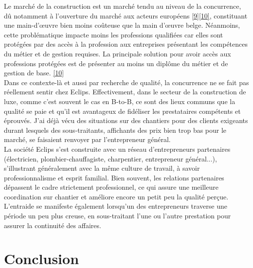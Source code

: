 \documentclass[a4paper, 12pt]{article}
\begin{document}
Le marché de la construction est un marché tendu au niveau de la concurrence, dû notamment à l'ouverture du marché aux acteurs européens \href{https://www.lesoir.be/art/803642/article/economie/immo/une-l-immo/2015-02-24/concurrence-deloyale-mine-secteur-construction}{[9]}\href{https://atradius.fr/publications/market-monitor-construction-belgique-2019.html}{[10]}, constituant une main-d'\oe{}uvre bien moins coûteuse que la main d'\oe{}uvre belge. Néanmoins, cette problématique impacte moins les professions qualifiées car elles sont protégées par des accès à la profession aux entreprises présentant les compétences du métier et de gestion requises. La principale solution pour avoir accès aux professions protégées est de présenter au moins un diplôme du métier et de gestion de base. \href{https://www.xerius.be/fr-be/devenir-independant/gestion-connaissances-professionnelles}{[10]}\\
Dans ce contexte-là et aussi par recherche de qualité, la concurrence ne se fait pas réellement sentir chez Eclips. Effectivement, dans le secteur de la construction de luxe, comme c'est souvent le cas en B-to-B, ce sont des lieux communs que la qualité se paie et qu'il est avantageux de fidéliser les prestataires compétents et éprouvés. J'ai déjà vécu des situations sur des chantiers pour des clients exigeants durant lesquels des sous-traitants, affichants des prix bien trop bas pour le marché, se faisaient renvoyer par l'entrepreneur général.\\

La société Eclips s'est construite avec un réseau d'entrepreneurs partenaires (électricien, plombier-chauffagiste, charpentier, entrepreneur général...), s'illustrant généralement avec la même culture de travail, à savoir professionnalisme et esprit familial. Bien souvent, les relations partenaires dépassent le cadre strictement professionnel, ce qui assure une meilleure coordination sur chantier et améliore encore un petit peu la qualité perçue. L'entraide se manifeste également lorsqu'un des entrepreneurs traverse une période un peu plus creuse, en sous-traitant l'une ou l'autre prestation pour assurer la continuité des affaires.

\section{Conclusion}
\end{document}
